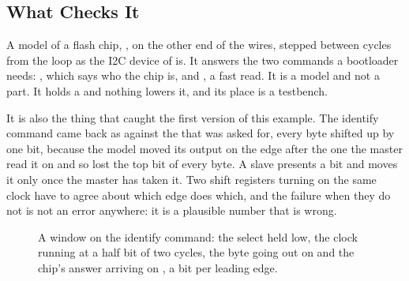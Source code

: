 \subsection{What Checks It}

A model of a flash chip, , on the other end of the
wires, stepped between cycles from the loop as the I2C device of
 is. It answers the two commands a bootloader needs:
, which says who the chip is, and , a fast read.
It is a model and not a part. It holds a  and nothing lowers
it, and its place is a testbench.

It is also the thing that caught the first version of this example.
The identify command came back as  against the
 that was asked for, every byte shifted up by one bit,
because the model moved its output on the edge after the one the
master read it on and so lost the top bit of every byte. A slave
presents a bit and moves it only once the master has taken it. Two
shift registers turning on the same clock have to agree about which
edge does which, and the failure when they do not is not an error
anywhere: it is a plausible number that is wrong.

\begin{figure}[htbp]
\centering

\caption{A window on the identify command: the select held low, the
clock running at a half bit of two cycles, the byte going out on
 and the chip's answer arriving on , a bit per
leading edge.}
\label{fig:x-spi}
\end{figure}





